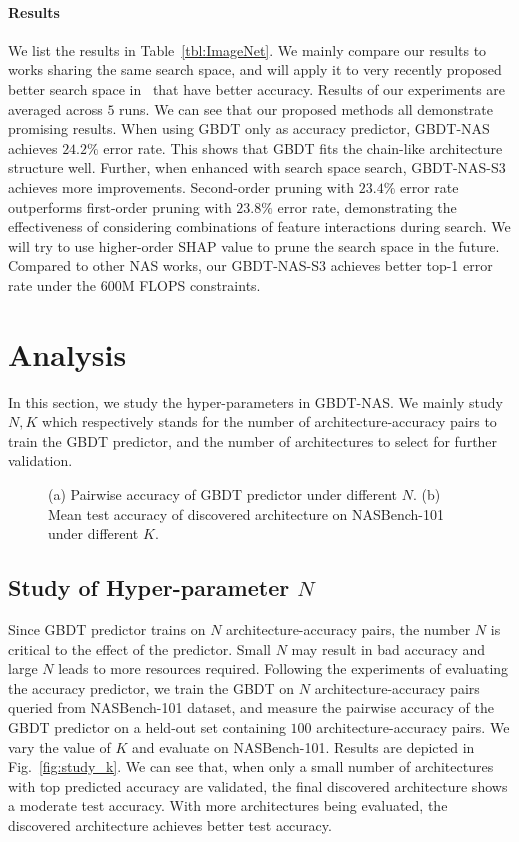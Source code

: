 \documentclass{article}
\begin{document}
\paragraph{Results} We list the results in Table~\ref{tbl:ImageNet}. We mainly compare our results to works sharing the same search space, and will apply it to very recently proposed better search space in~\cite{onceforall,bignas,fbnetv2,fbnetv3} that have better accuracy. Results of our experiments are averaged across $5$ runs. We can see that our proposed methods all demonstrate promising results. When using GBDT only as accuracy predictor, GBDT-NAS achieves $24.2\%$ error rate. This shows that GBDT fits the chain-like architecture structure well. Further, when enhanced with search space search, GBDT-NAS-S3 achieves more improvements. Second-order pruning with $23.4\%$ error rate outperforms first-order pruning with $23.8\%$ error rate, demonstrating the effectiveness of considering combinations of feature interactions during search. We will try to use higher-order SHAP value to prune the search space in the future. Compared to other NAS works, our GBDT-NAS-S3 achieves better top-1 error rate under the $600$M FLOPS constraints.

\section{Analysis}
In this section, we study the hyper-parameters in GBDT-NAS. We mainly study $N,K$ which respectively stands for the number of architecture-accuracy pairs to train the GBDT predictor, and the number of architectures to select for further validation.

\begin{figure}[htbp]
\centering
{}
\caption{(a) Pairwise accuracy of GBDT predictor under different $N$. (b) Mean test accuracy of discovered architecture on NASBench-101 under different $K$.}
\end{figure}

\subsection{Study of Hyper-parameter $N$}
Since GBDT predictor trains on $N$ architecture-accuracy pairs, the number $N$ is critical to the effect of the predictor. Small $N$ may result in bad accuracy and large $N$ leads to more resources required. Following the experiments of evaluating the accuracy predictor, we train the GBDT on $N$ architecture-accuracy pairs queried from NASBench-101 dataset, and measure the pairwise accuracy of the GBDT predictor on a held-out set containing $100$ architecture-accuracy pairs. We vary the value of $K$ and evaluate on NASBench-101. Results are depicted in Fig.~\ref{fig:study_k}. We can see that, when only a small number of architectures with top predicted accuracy are validated, the final discovered architecture shows a moderate test accuracy. With more architectures being evaluated, the discovered architecture achieves better test accuracy.
\end{document}
